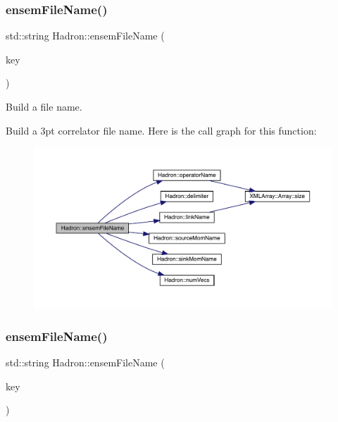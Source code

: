 \subsubsection{\texorpdfstring{ensemFileName()}{ensemFileName()}\hspace{0.1cm}{\footnotesize\ttfamily [4/12]}}
{\footnotesize\ttfamily std\+::string Hadron\+::ensem\+File\+Name (\begin{DoxyParamCaption}\item[{const \mbox{\hyperlink{structFF_1_1KeyHadron3PtCorr__t}{F\+F\+::\+Key\+Hadron3\+Pt\+Corr\+\_\+t}} \&}]{key }\end{DoxyParamCaption})}



Build a file name. 

Build a 3pt correlator file name. Here is the call graph for this function\+:\nopagebreak
\begin{figure}[H]
\begin{center}
\leavevmode
\includegraphics[width=350pt]{d1/daf/namespaceHadron_a1043f4c7b4a30f750e2484e69ff0a25b_cgraph}
\end{center}
\end{figure}
\mbox{\label{namespaceHadron_a427c61121d387abc689b090161709921}} 
\subsubsection{\texorpdfstring{ensemFileName()}{ensemFileName()}\hspace{0.1cm}{\footnotesize\ttfamily [5/12]}}
{\footnotesize\ttfamily std\+::string Hadron\+::ensem\+File\+Name (\begin{DoxyParamCaption}\item[{const \mbox{\hyperlink{structHadron_1_1KeyHadronNPartNPtConnGraph__t}{Key\+Hadron\+N\+Part\+N\+Pt\+Conn\+Graph\+\_\+t}} \&}]{key }\end{DoxyParamCaption})}



